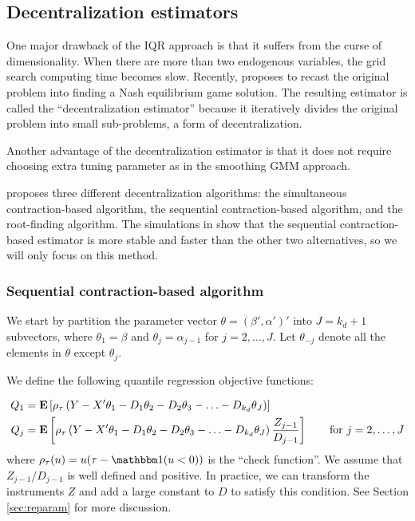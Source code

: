 \subsection{Decentralization estimators} \label{sec:dec_method}
One major drawback of the IQR approach is that it suffers from the curse of
dimensionality. When there are more than two endogenous variables, the grid
search computing time becomes slow. Recently, \cite{Kaido2021} proposes to
recast the original problem into finding a Nash equilibrium game solution. The
resulting estimator is called the ``decentralization estimator'' because it
iteratively divides the original problem into small sub-problems, a form of
decentralization. 

Another advantage of the decentralization estimator is that it does not require
choosing extra tuning parameter as in the smoothing GMM approach.

\cite{Kaido2021} proposes three different decentralization algorithms: the
simultaneous contraction-based algorithm, the sequential contraction-based
algorithm, and the root-finding algorithm. The simulations in \cite{Kaido2021}
show that the sequential contraction-based estimator is more stable and faster
than the other two alternatives, so we will only focus on this method.

\subsubsection{Sequential contraction-based algorithm}	
We start by partition the parameter vector $\theta = (\beta', \alpha')'$ into $J
= k_d + 1$ subvectors, where $\theta_1 = \beta$ and $\theta_{j} = \alpha_{j-1}$
for $j = 2, \ldots, J$. Let $\theta_{-j}$ denote all the elements in $\theta$
except $\theta_j$. 

We define the following quantile regression objective functions:

\begin{align}
Q_1 &= \mathbf{E}\left[ \rho_{\tau} \left(Y - X'\theta_1 - 	
	D_1\theta_2 - D_2\theta_3 - \ldots - D_{k_d}\theta_J \right) \right] \\
Q_j &= \mathbf{E}\left[ \rho_{\tau} 
\left(
Y - X'\theta_1 - D_1\theta_2 - D_2\theta_3 - \ldots - D_{k_d}\theta_J 
\right) 
	\frac{Z_{j-1}}{D_{j-1}}
	\right] \qquad \text{for } j=2, \ldots, J 
\end{align}
where $\rho_{\tau}(u) = u(\tau - \I(u < 0))$ is the ``check function''. We
assume that $Z_{j-1}/D_{j-1}$ is well defined and positive. In practice, we can
transform the instruments $Z$ and add a large constant to $D$ to satisfy this
condition.  See Section \ref{sec:reparam} for more discussion.

